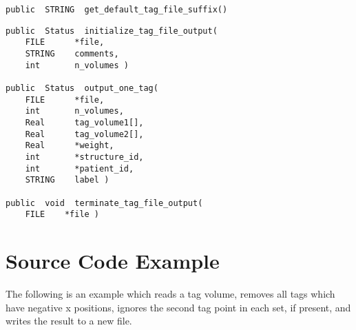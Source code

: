 {\bf\begin{verbatim}
public  STRING  get_default_tag_file_suffix()
\end{verbatim}}


{\bf\begin{verbatim}
public  Status  initialize_tag_file_output(
    FILE      *file,
    STRING    comments,
    int       n_volumes )

public  Status  output_one_tag(
    FILE      *file,
    int       n_volumes,
    Real      tag_volume1[],
    Real      tag_volume2[],
    Real      *weight,
    int       *structure_id,
    int       *patient_id,
    STRING    label )

public  void  terminate_tag_file_output(
    FILE    *file )
\end{verbatim}}


\section{Source Code Example}

The following is an example which reads a tag volume, removes all tags
which have negative x positions, ignores the second tag point in each
set, if present, and writes the result to a new file.

